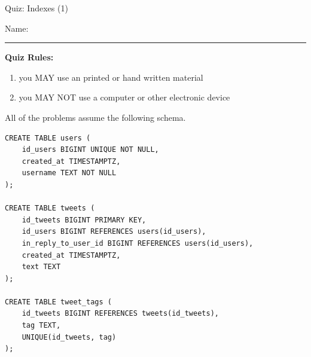 \documentclass[12pt]{exam}
\theoremstyle{definition}
\begin{document}
\begin{center}
    {
\Large
    Quiz: Indexes (1)
}
\end{center}


\vspace{0.15in}

\vspace{0.25in}
\noindent
Name: 

\noindent
\rule{\textwidth}{0.1pt}
\vspace{0.15in}

\noindent
\textbf{Quiz Rules:} 

\noindent
\begin{enumerate}
\item you MAY use an printed or hand written material
\item you MAY NOT use a computer or other electronic device
\end{enumerate}
\newpage



\noindent
All of the problems assume the following schema.
\begin{lstlisting}
CREATE TABLE users (
    id_users BIGINT UNIQUE NOT NULL,
    created_at TIMESTAMPTZ,
    username TEXT NOT NULL
);

CREATE TABLE tweets (
    id_tweets BIGINT PRIMARY KEY,
    id_users BIGINT REFERENCES users(id_users),
    in_reply_to_user_id BIGINT REFERENCES users(id_users),
    created_at TIMESTAMPTZ,
    text TEXT
);

CREATE TABLE tweet_tags (
    id_tweets BIGINT REFERENCES tweets(id_tweets),
    tag TEXT,
    UNIQUE(id_tweets, tag)
);
\end{lstlisting}
\end{document}
